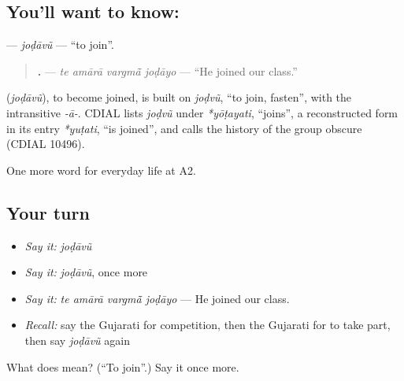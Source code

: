 \subsection*{You'll want to know: }
\textbf{} — \emph{joḍāvũ} — \textquotedblleft{}to join\textquotedblright{}.

\begin{quote}
\textbf{   .} — \emph{te amārā vargmā̃ joḍāyo} — \textquotedblleft{}He joined our class.\textquotedblright{}
\end{quote}

\begin{cousinweb}
\textbf{} (\emph{joḍāvũ}), to become joined, is built on \emph{joḍvũ}, \textquotedblleft{}to join, fasten\textquotedblright{}, with the intransitive \emph{-ā-}. CDIAL lists \emph{joḍvũ} under \emph{*yōṭayati}, \textquotedblleft{}joins\textquotedblright{}, a reconstructed form in its entry \emph{*yuṭati}, \textquotedblleft{}is joined\textquotedblright{}, and calls the history of the group obscure (CDIAL 10496).
\end{cousinweb}

\begin{grammarlens}[title={What you've built}]
One more word for everyday life at A2.
\end{grammarlens}

\subsection*{Your turn}
\begin{itemize}
\raggedright
  \item \emph{Say it:} \emph{joḍāvũ}
  \item \emph{Say it:} \emph{joḍāvũ}, once more
  \item \emph{Say it:} \emph{te amārā vargmā̃ joḍāyo} — He joined our class.
  \item \emph{Recall:} say the Gujarati for competition, then the Gujarati for to take part, then say \emph{joḍāvũ} again
\end{itemize}

\begin{tcolorbox}[breakable,colback=teal!4,colframe=teal!35!black,title={Before you move on}]
What does  mean? (\textquotedblleft{}To join\textquotedblright{}.) Say it once more.
\end{tcolorbox}
